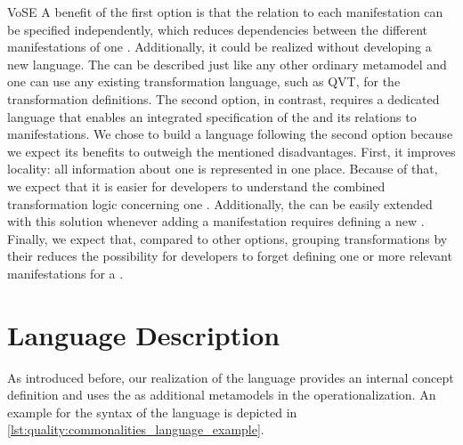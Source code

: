 \begin{copiedFrom}{VoSE}
A benefit of the first option is that the relation to each manifestation can be specified independently, which reduces dependencies between the different manifestations of one \conceptmetamodel.
Additionally, it could be realized without developing a new language. The \conceptmetamodels can be described just like any other ordinary metamodel and one can use any existing transformation language, such as QVT, for the transformation definitions.
The second option, in contrast, requires a dedicated language that enables an integrated specification of the \conceptmetamodel and its relations to manifestations.
We chose to build a language following the second option because we expect its benefits to outweigh the mentioned disadvantages.
First, it improves locality: all information about one \commonality is represented in one place.
Because of that, we expect that it is easier for developers to understand the combined transformation logic concerning one \commonality.
Additionally, the \conceptmetamodel can be easily extended with this solution whenever adding a manifestation requires defining a new \commonality.
Finally, we expect that, compared to other options, grouping transformations by their \commonality reduces the possibility for developers to forget defining one or more relevant manifestations for a \commonality.


\section*{Language Description}

As introduced before, our realization of the \commonalities language
provides an internal concept definition and uses the \conceptmetamodels as additional metamodels in the operationalization.
An example for the syntax of the \commonalities language is depicted in \autoref{lst:quality:commonalities_language_example}.


\end{copiedFrom}
